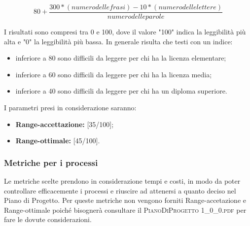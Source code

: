 		\[ 80+\frac{300*(numero delle frasi)-10*(numero delle lettere)}{numero delle parole} \]
		
		
		I risultati sono compresi tra 0 e 100, dove il valore "100" indica la leggibilità più alta e "0" la leggibilità più bassa. In generale risulta che testi con un indice:
		\begin{itemize}
			\item inferiore a 80 sono difficili da leggere per chi ha la licenza elementare;
			\item inferiore a 60 sono difficili da leggere per chi ha la licenza media;
			\item inferiore a 40 sono difficili da leggere per chi ha un diploma superiore.
		\end{itemize}
	
		I parametri presi in considerazione saranno:
	
		\begin{itemize}
			\item \textbf{Range-accettazione: }[35/100];
			\item \textbf{Range-ottimale: }[45/100].
		\end{itemize}
	
		\subsubsection{Metriche per i processi}
		Le metriche scelte prendono in considerazione tempi e costi, in modo da poter controllare efficacemente i processi e riuscire ad attenersi a quanto deciso nel Piano di Progetto. 
		Per queste metriche non vengono forniti Range-accetazione e Range-ottimale poiché bisognerà consultare il \textsc{PianoDiProgetto 1\_0\_0.pdf} per fare le dovute considerazioni.
		

